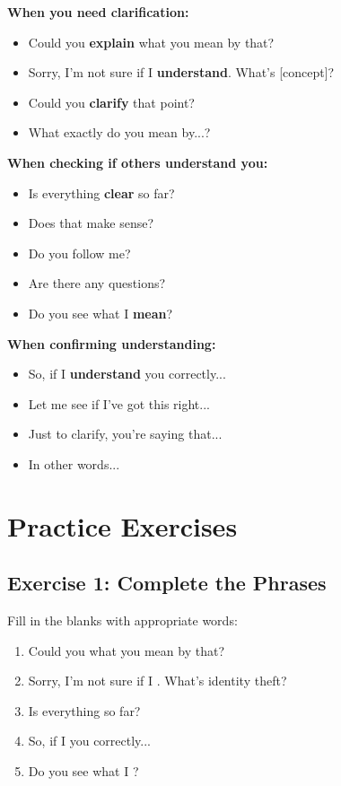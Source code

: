 \begin{grammarbox}[title=Phrases for Checking Understanding]
\textbf{When you need clarification:}
\begin{itemize}
    \item Could you \textbf{explain} what you mean by that?
    \item Sorry, I'm not sure if I \textbf{understand}. What's [concept]?
    \item Could you \textbf{clarify} that point?
    \item What exactly do you mean by...?
\end{itemize}

\textbf{When checking if others understand you:}
\begin{itemize}
    \item Is everything \textbf{clear} so far?
    \item Does that make sense?
    \item Do you follow me?
    \item Are there any questions?
    \item Do you see what I \textbf{mean}?
\end{itemize}

\textbf{When confirming understanding:}
\begin{itemize}
    \item So, if I \textbf{understand} you correctly...
    \item Let me see if I've got this right...
    \item Just to clarify, you're saying that...
    \item In other words...
\end{itemize}
\end{grammarbox}

\section{Practice Exercises}

\subsection{Exercise 1: Complete the Phrases}
Fill in the blanks with appropriate words:

\begin{enumerate}
    \item Could you \underline{\hspace{3cm}} what you mean by that?
    \item Sorry, I'm not sure if I \underline{\hspace{3cm}}. What's identity theft?
    \item Is everything \underline{\hspace{3cm}} so far?
    \item So, if I \underline{\hspace{3cm}} you correctly...
    \item Do you see what I \underline{\hspace{3cm}}?
\end{enumerate}


